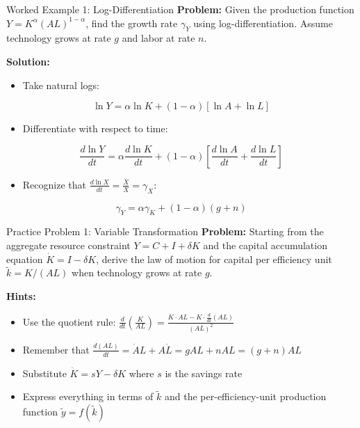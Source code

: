 \begin{frame}{Worked Example 1: Log-Differentiation}
\textbf{Problem:} Given the production function $Y = K^\alpha (AL)^{1-\alpha}$, find the growth rate $\gamma_Y$ using log-differentiation. Assume technology grows at rate $g$ and labor at rate $n$.

\bigskip
\textbf{Solution:}

\begin{itemize}
\item Take natural logs:
\end{itemize}

\[
\ln Y = \alpha \ln K + (1-\alpha)[\ln A + \ln L]
\]

\begin{itemize}
\item Differentiate with respect to time:
\end{itemize}

\[
\frac{d\ln Y}{dt} = \alpha \frac{d\ln K}{dt} + (1-\alpha)\left[\frac{d\ln A}{dt} + \frac{d\ln L}{dt}\right]
\]

\begin{itemize}
\item Recognize that $\frac{d\ln X}{dt} = \frac{\dot{X}}{X} = \gamma_X$:
\end{itemize}

\[
\gamma_Y = \alpha \gamma_K + (1-\alpha)(g + n)
\]


\end{frame}

\begin{frame}{Practice Problem 1: Variable Transformation}
\textbf{Problem:} Starting from the aggregate resource constraint $Y = C + I + \delta K$ and the capital accumulation equation $\dot{K} = I - \delta K$, derive the law of motion for capital per efficiency unit $\tilde{k} = K/(AL)$ when technology grows at rate $g$.

\bigskip
\textbf{Hints:}
\begin{itemize}
\item Use the quotient rule: $\frac{d}{dt}\left(\frac{K}{AL}\right) = \frac{\dot{K} \cdot AL - K \cdot \frac{d}{dt}(AL)}{(AL)^2}$
\item Remember that $\frac{d(AL)}{dt} = \dot{A}L + A\dot{L} = gAL + nAL = (g+n)AL$
\item Substitute $\dot{K} = sY - \delta K$ where $s$ is the savings rate
\item Express everything in terms of $\tilde{k}$ and the per-efficiency-unit production function $\tilde{y} = f(\tilde{k})$
\end{itemize}

\end{frame}

